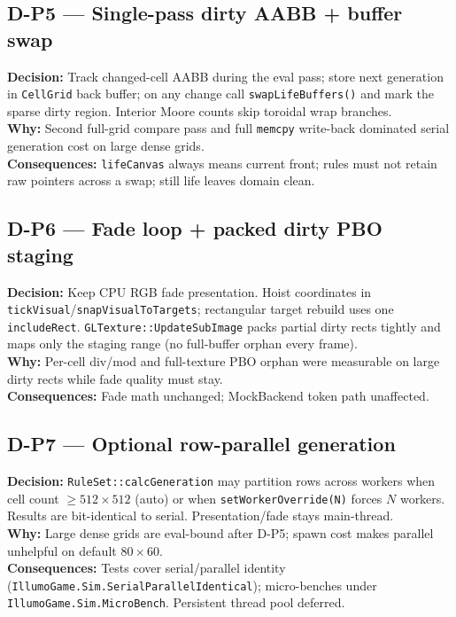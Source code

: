 \subsection*{D-P5 --- Single-pass dirty AABB + buffer swap}
\begin{decisionbox}[title={D-P5 \quad 2026-08-06}]
\textbf{Decision:} Track changed-cell AABB during the eval pass; store next
generation in \texttt{CellGrid} back buffer; on any change call
\texttt{swapLifeBuffers()} and mark the sparse dirty region. Interior Moore
counts skip toroidal wrap branches.\\
\textbf{Why:} Second full-grid compare pass and full \texttt{memcpy} write-back
dominated serial generation cost on large dense grids.\\
\textbf{Consequences:} \texttt{lifeCanvas} always means current front; rules
must not retain raw pointers across a swap; still life leaves domain clean.
\end{decisionbox}

\subsection*{D-P6 --- Fade loop + packed dirty PBO staging}
\begin{decisionbox}[title={D-P6 \quad 2026-08-06}]
\textbf{Decision:} Keep CPU RGB fade presentation. Hoist coordinates in
\texttt{tickVisual}/\texttt{snapVisualToTargets}; rectangular target rebuild
uses one \texttt{includeRect}. \texttt{GLTexture::UpdateSubImage} packs partial
dirty rects tightly and maps only the staging range (no full-buffer orphan
every frame).\\
\textbf{Why:} Per-cell div/mod and full-texture PBO orphan were measurable on
large dirty rects while fade quality must stay.\\
\textbf{Consequences:} Fade math unchanged; MockBackend token path unaffected.
\end{decisionbox}

\subsection*{D-P7 --- Optional row-parallel generation}
\begin{decisionbox}[title={D-P7 \quad 2026-08-06}]
\textbf{Decision:} \texttt{RuleSet::calcGeneration} may partition rows across
workers when cell count $\ge 512\times 512$ (auto) or when
\texttt{setWorkerOverride(N)} forces $N$ workers. Results are bit-identical to
serial. Presentation/fade stays main-thread.\\
\textbf{Why:} Large dense grids are eval-bound after D-P5; spawn cost makes
parallel unhelpful on default $80\times 60$.\\
\textbf{Consequences:} Tests cover serial/parallel identity
(\texttt{IllumoGame.Sim.SerialParallelIdentical}); micro-benches under
\texttt{IllumoGame.Sim.MicroBench}. Persistent thread pool deferred.
\end{decisionbox}

